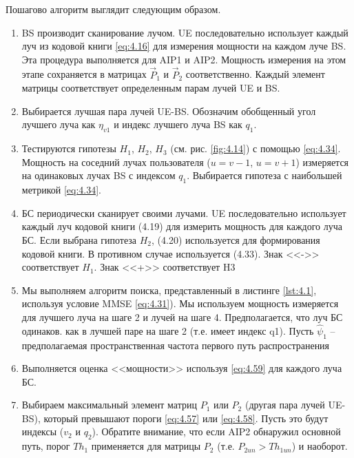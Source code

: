 Пошагово алгоритм выглядит следующим образом.
\begin{enumerate}[label=\textbf{Шаг \arabic*:}]
    \item BS производит сканирование лучом. UE последовательно использует
          каждый луч из кодовой книги \eqref{eq:4.16}
          для измерения мощности на каждом луче BS.  Эта процедура
          выполняется для AIP1 и AIP2. Мощность измерения на этом этапе
          сохраняется в матрицах $\vec P_1$ и $\vec P_2$ соответственно.
          Каждый элемент матрицы соответствует
          определенным парам лучей UE и BS.
    \item Выбирается лучшая пара лучей UE-BS. Обозначим обобщенный угол
          лучшего луча как $\eta_{v1}$ и индекс лучшего луча BS как
          $q_1$.
    \item Тестируются гипотезы $H_1$, $H_2$, $H_3$ (см. рис. \ref{fig:4.14}) с
          помощью \eqref{eq:4.34}. Мощность на соседний лучах пользователя
          ($u=v-1$, $u=v+1$) измеряется на одинаковых лучах BS с индексом
          $q_1$. Выбирается гипотеза с наибольшей метрикой \eqref{eq:4.34}.
    \item БС периодически сканирует своими лучами.
          UE последовательно использует каждый луч кодовой книги (4.19) для
          измерить мощность для каждого луча БС. Если выбрана гипотеза $H_2$,
          (4.20) используется для формирования кодовой книги.
          В противном случае используется (4.33).
          Знак <<->> соответствует $H_1$. Знак <<+>> соответствует H3
    \item Мы выполняем алгоритм поиска, представленный в листинге \ref{lst:4.1}, используя
          условие MMSE \eqref{eq:4.31}).
          Мы используем мощность измеряется для лучшего луча на
          шаге 2 и лучей на шаге 4. Предполагается, что луч БС одинаков.
          как в лучшей
          паре на шаге 2 (т.е. имеет индекс q1). Пусть $\hat \psi_1$ --
          предполагаемая пространственная частота первого путь распространения
    \item Выполняется оценка <<мощности>> используя \eqref{eq:4.59} для
          каждого луча БС.
    \item Выбираем максимальный элемент матриц $P_1$ или $P_2$ (другая пара лучей
          UE-BS), который превышают пороги \eqref{eq:4.57} или \eqref{eq:4.58}.
          Пусть это будут индексы
          ($v_2$ и $q_2$).
          Обратите внимание, что если AIP2 обнаружил основной путь, порог
          $Th_1$ применяется для матрицы $P_2$ (т.е. $P_{2un} > Th_{1un}$) и наоборот.

\end{enumerate}
